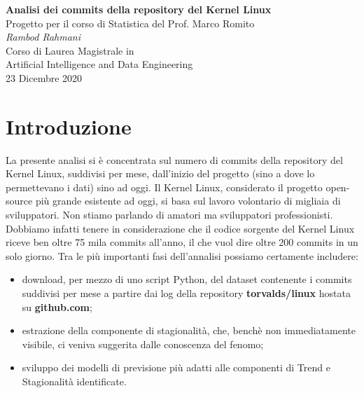 \documentclass[11pt,a4paper]{article}
\begin{document}
\begin{center}
	\Large\textbf{Analisi dei commits della repository del Kernel Linux}\\
	\vspace{0.2cm}
	\large{Progetto per il corso di Statistica del Prof. Marco Romito}\\
	\vspace{0.5cm}
	\large\textit{Rambod Rahmani}\\
	\vspace{0.2cm}
	\scriptsize{Corso di Laurea Magistrale in\\Artificial Intelligence and
	Data Engineering}\\
	\vspace{0.5cm}
	\normalsize{23 Dicembre 2020}
\end{center}

\tableofcontents

\section{Introduzione}
La presente analisi si \`e concentrata sul numero di commits della repository
del Kernel Linux, suddivisi per mese, dall'inizio del progetto (sino a dove lo
permettevano i dati) sino ad oggi. Il Kernel Linux, considerato il progetto
open-source pi\`u grande esistente ad oggi, si basa sul lavoro volontario di
migliaia di sviluppatori. Non stiamo parlando di amatori ma sviluppatori
professionisti. Dobbiamo infatti tenere in considerazione che il codice sorgente
del Kernel Linux riceve ben oltre 75 mila commits all'anno, il che vuol dire
oltre 200 commits in un solo giorno. Tra le pi\`u importanti fasi dell'annalisi
possiamo certamente includere:
\begin{itemize}
	\setlength\itemsep{0mm}
	\item download, per mezzo di uno script Python, del dataset contenente
		i commits suddivisi per mese a partire dai log della repository
		\textbf{torvalds/linux} hostata su \textbf{github.com};
	\item estrazione della componente di stagionalit\`a, che, bench\`e non
		immediatamente visibile, ci veniva suggerita dalle conoscenza
		del fenomo;
	\item sviluppo dei modelli di previsione pi\`u adatti alle componenti
		di Trend e Stagionalit\`a identificate.
\end{itemize}
\end{document}
